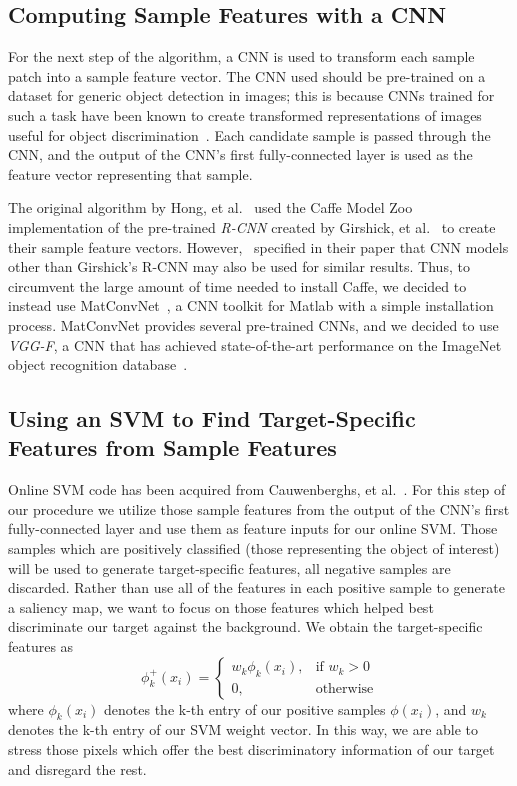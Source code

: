 \documentclass{sig-alternate-05-2015}
\begin{document}
\subsection{Computing Sample Features with a CNN}
For the next step of the algorithm, a CNN is used to transform each sample patch into a sample feature vector.
The CNN used should be pre-trained on a dataset for generic object detection in images; this is because CNNs trained for such a task have been known to create transformed representations of images useful for object discrimination~\cite{krizhevsky2012imagenet}.
Each candidate sample is passed through the CNN, and the output of the CNN's first fully-connected layer is used as the feature vector representing that sample.

The original algorithm by Hong, et al.~\cite{hong2015online} used the Caffe Model Zoo implementation of the pre-trained \textit{R-CNN} created by Girshick, et al.~\cite{girshick2016region} to create their sample feature vectors.
However,~\cite{hong2015online} specified in their paper that CNN models other than Girshick's R-CNN may also be used for similar results.
Thus, to circumvent the large amount of time needed to install Caffe, we decided to instead use MatConvNet~\cite{vedaldi2015matconvnet}, a CNN toolkit for Matlab with a simple installation process.
MatConvNet provides several pre-trained CNNs, and we decided to use \textit{VGG-F}, a CNN that has achieved state-of-the-art performance on the ImageNet object recognition database~\cite{chatfield2014return}.

\subsection{Using an SVM to Find Target-Specific Features from Sample Features}
Online SVM code has been acquired from Cauwenberghs, et al.~\cite{cauwenberghs2001incremental}. For this step of our procedure we utilize those sample features from the output of the CNN's first fully-connected layer and use them as feature inputs for our online SVM. Those samples which are positively classified (those representing the object of interest) will be used to generate target-specific features, all negative samples are discarded. Rather than use all of the features in each positive sample to generate a saliency map, we want to focus on those features which helped best discriminate our target against the background. We obtain the target-specific features as\newline
\[\phi_k^+(x_i) = 
\begin{cases}
w_k\phi_k(x_i),& \text{if } w_k > 0\\
0, 			   & \text{otherwise}
\end{cases}
\]  \newline
where $\phi_k(x_i)$ denotes  the k-th entry of our positive samples $\phi(x_i)$, and $w_k$ denotes the k-th entry of our SVM weight vector. In this way, we are able to stress those pixels which offer the best discriminatory information of our target and disregard the rest. 
\end{document}
